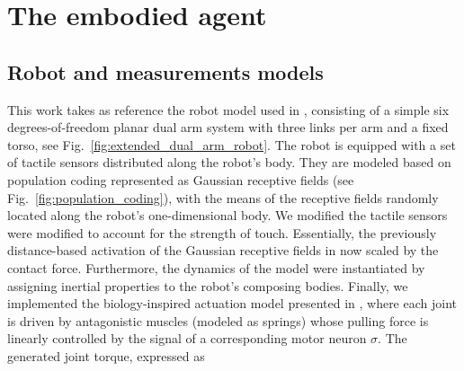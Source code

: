 \section{The embodied agent}


\subsection{Robot and measurements models}
This work takes as reference the robot model used in \cite{Mannella2018Knowyourbody,Marcel2022Learningreachown}, consisting of a simple six degrees-of-freedom planar dual arm system with three links per arm and a fixed torso, see Fig.~\ref{fig:extended_dual_arm_robot}. The robot is equipped with a set of tactile sensors distributed along the robot's body. They are modeled based on population coding \cite{Panzeri2010PopulationCoding} represented as Gaussian receptive fields (see Fig.~\ref{fig:population_coding}), with the means of the receptive fields randomly located along the robot's one-dimensional body. We modified the tactile sensors were modified to account for the strength of touch. Essentially, the previously distance-based activation of the Gaussian receptive fields in now scaled by the contact force. Furthermore, the dynamics of the model were instantiated by assigning inertial properties to the robot's composing bodies. Finally, we implemented the biology-inspired actuation model presented in \cite{Ekeberg1993combinedneuronalmechanical,Wadden1998neuromechanicalmodel, Shim2012Chaoticexplorationlearning}, where each joint is driven by antagonistic muscles (modeled as springs) whose pulling force is linearly controlled by the signal of a corresponding motor neuron $\sigma$. The generated joint torque, expressed as
